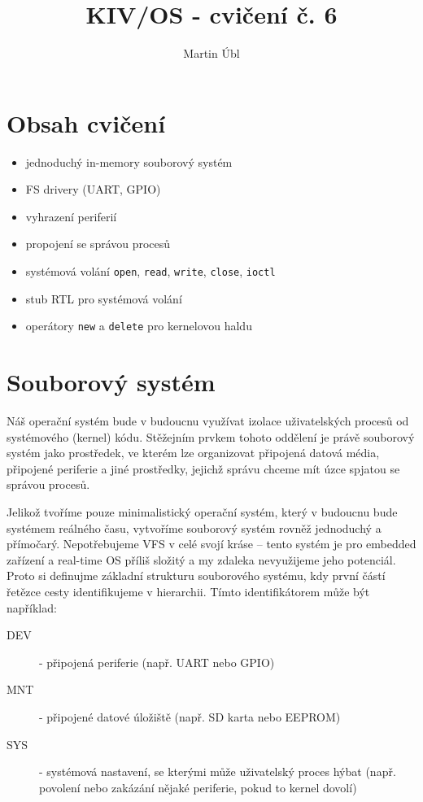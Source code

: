\documentclass{article}
\author{Martin Úbl}
\title{KIV/OS - cvičení č. 6}
\begin{document}
\maketitle

\section{Obsah cvičení}

\begin{itemize}
	\item jednoduchý in-memory souborový systém
	\item FS drivery (UART, GPIO)
	\item vyhrazení periferií
	\item propojení se správou procesů
	\item systémová volání \texttt{open}, \texttt{read}, \texttt{write}, \texttt{close}, \texttt{ioctl}
	\item stub RTL pro systémová volání
	\item operátory \texttt{new} a \texttt{delete} pro kernelovou haldu
\end{itemize}

\section{Souborový systém}

Náš operační systém bude v budoucnu využívat izolace uživatelských procesů od systémového (kernel) kódu. Stěžejním prvkem tohoto oddělení je právě souborový systém jako prostředek, ve kterém lze organizovat připojená datová média, připojené periferie a jiné prostředky, jejichž správu chceme mít úzce spjatou se správou procesů.

Jelikož tvoříme pouze minimalistický operační systém, který v budoucnu bude systémem reálného času, vytvoříme souborový systém rovněž jednoduchý a přímočarý. Nepotřebujeme VFS v celé svojí kráse -- tento systém je pro embedded zařízení a real-time OS příliš složitý a my zdaleka nevyužijeme jeho potenciál. Proto si definujme základní strukturu souborového systému, kdy první částí řetězce cesty identifikujeme  v hierarchii. Tímto identifikátorem může být například:
\begin{description}
	\item[DEV] - připojená periferie (např. UART nebo GPIO)
	\item[MNT] - připojené datové úložiště (např. SD karta nebo EEPROM)
	\item[SYS] - systémová nastavení, se kterými může uživatelský proces hýbat (např. povolení nebo zakázání nějaké periferie, pokud to kernel dovolí)
\end{description}
\end{document}
